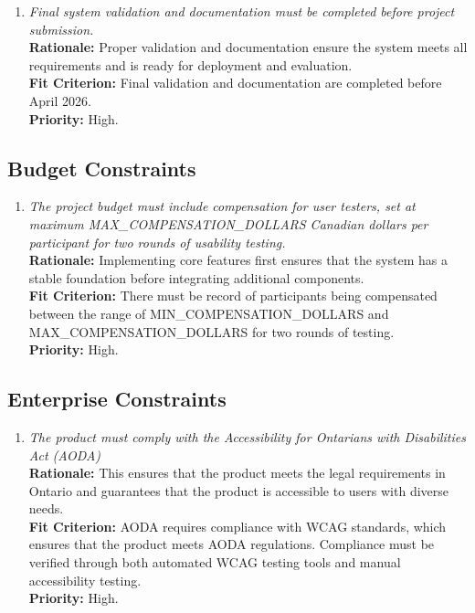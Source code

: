 \documentclass[12pt]{article}
\begin{document}
\begin{enumerate}[label=MD-SC \arabic*., wide=0pt, leftmargin=*]
     \item \emph{Final system validation and documentation must be completed before project submission.}\\[2mm]
    {\bf Rationale:} Proper validation and documentation ensure the system meets all requirements and is 
    ready for deployment and evaluation.\\
    {\bf Fit Criterion:} Final validation and documentation are completed before April 2026. \\
    {\bf Priority:} High.


\end{enumerate}
\subsection{Budget Constraints}
\begin{enumerate}[label=MD-BC \arabic*., wide=0pt, leftmargin=*]
  \item \emph{The project budget must include compensation for user
      testers, set at maximum MAX\_COMPENSATION\_DOLLARS Canadian dollars per participant for two rounds
    of usability testing.}\\[2mm]
    {\bf Rationale:} Implementing core features first ensures that the system has a stable foundation before 
    integrating additional components.\\ 
    {\bf Fit Criterion:} There must be record of participants being
    compensated between the range of MIN\_COMPENSATION\_DOLLARS and MAX\_COMPENSATION\_DOLLARS for
    two rounds of testing. \\
    {\bf Priority:} High.
\end{enumerate}
\subsection{Enterprise Constraints}
\begin{enumerate}[label=MD-EC \arabic*., wide=0pt, leftmargin=*]
  \item \emph{The product must comply with the Accessibility for
    Ontarians with Disabilities Act (AODA)}\\[2mm]
    {\bf Rationale:} This ensures that the product meets the legal
    requirements in Ontario and guarantees that
    the product is accessible to users with diverse needs.\\
    {\bf Fit Criterion:} AODA requires compliance with WCAG
    standards, which ensures that the product meets AODA regulations.
    Compliance must be verified through both automated WCAG testing
    tools and manual accessibility testing.\\
    {\bf Priority:} High.
\end{enumerate}
\end{document}
